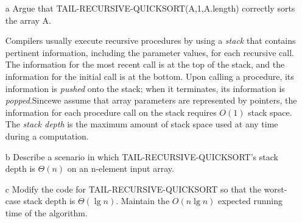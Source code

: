 \documentclass{article}
\begin{document}
  \begin{enumerate}
    \item[a] Argue that TAIL-RECURSIVE-QUICKSORT(A,1,A.length) correctly sorts the array A.
    

    Compilers usually execute recursive procedures by using a \textit{stack} that contains pertinent information, including the parameter values, for each recursive call. The information for the most recent call is at the top of the stack, and the information for the initial call is at the bottom. Upon calling a procedure, its information is \textit{pushed} onto the stack; when it terminates, its information is \textit{popped}.Sincewe assume that array parameters are represented by pointers, the information for each procedure call on the stack requires $O(1)$ stack space. The \textit{stack depth} is the maximum amount of stack space used at any time during a computation.
    
    
    \item[b] Describe a scenario in which TAIL-RECURSIVE-QUICKSORT's stack depth is $\Theta(n)$ on an n-element input array.
    \item[c] Modify the code for TAIL-RECURSIVE-QUICKSORT so that the worst-case stack depth is $\Theta(\lg n)$. Maintain the $O(n \lg n)$ expected running time of the algorithm.
  \end{enumerate}
\end{document}
